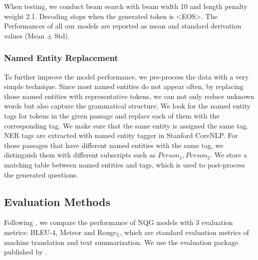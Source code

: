 \documentclass[letterpaper]{article} %
\begin{document}
When testing, we conduct beam search with beam width 10 and length penalty weight 2.1. Decoding stops when the generated token is  \textless EOS\textgreater{}. The Performances of all our models are reported as mean and standard derivation values (Mean $\pm$ Std).
%
%
%



\subsubsection{Named Entity Replacement}
To further improve the model performance, we pre-process the data with a very simple technique. Since most named entities do not appear often, by replacing those named entities with representative tokens, we can not only reduce unknown words but also capture the grammatical structure. We look for the named entity tags for tokens in the given passage and replace each of them with the corresponding tag. We make sure that the same entity is assigned the same tag. NER tags are extracted with named entity tagger in Stanford CoreNLP. For those passages that have different named entities with the same tag, we distinguish them with different subscripts such as \(Person_1, Person_2\). We store a matching table between named entities and tags, which is used to post-process the generated questions.



\subsection{Evaluation Methods}
Following \cite{zhou2017neural,song2018leveraging}, we compare the performance of NQG models with 3 evaluation metrics: BLEU-4, Meteor and Rouge\(_L\), which are standard evaluation metrics of machine translation and text summarization. We use the evaluation package published by \cite{chen2015microsoft}.
%
%
\end{document}
